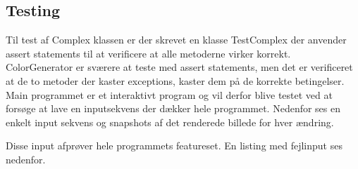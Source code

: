 \subsection{Testing}

Til test af Complex klassen er der skrevet en klasse TestComplex der anvender assert statements til at verificere at alle metoderne virker korrekt. \\
ColorGenerator er sværere at teste med assert statements, men det er verificeret at de to metoder der kaster exceptions, kaster dem på de korrekte betingelser. \\

Main programmet er et interaktivt program og vil derfor blive testet ved at forsøge at lave en inputsekvens der dækker hele programmet. Nedenfor ses en enkelt input sekvens og snapshots af det renderede billede for hver ændring.

Disse input afprøver hele programmets featureset. En listing med fejlinput ses nedenfor.

